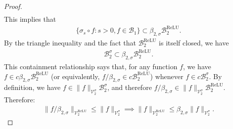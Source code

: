 \documentclass{article}
\DeclareMathOperator{\ReLU}{\mathrm{ReLU}}
\def\cB{{\mathcal{B}}}
\def\cV{{\mathcal{V}}}
\begin{document}
\begin{appendices}
\begin{proof}
\begin{align}
    \end{align}
    This implies that
    \begin{align}
        \{ \sigma_s \circ f: s > 0, f \in \cB_1 \} \subset \beta_{2,\sigma} \cB_2^{\ReLU}.
    \end{align}
    By the triangle inequality and the fact that $\cB_2^{\ReLU}$ is itself closed, we have
    \begin{align}
        \cB_2^\sigma \subset \beta_{2,\sigma} \cB_2^{\ReLU}. 
    \end{align}
    This containment relationship says that, for any function $f$, we have $f \in c \beta_{2,\sigma} \cB_2^{\ReLU}$ (or equivalently, $f/\beta_{2,\sigma} \in c \cB_2^{\ReLU}$) whenever $f \in c  \cB_2^\sigma$. By definition, we have $f \in \| f \|_{\cV_2^\sigma} \cB_2^\sigma$, and therefore $f / \beta_{2,\sigma} \in \| f \|_{\cV_2^\sigma} \cB_2^{\ReLU}$. Therefore:
    \begin{align}
        \| f / \beta_{2,\sigma} \|_{\cV_2^{\ReLU}} \leq \| f \|_{\cV_2^\sigma} \implies \| f \|_{\cV_2^{\ReLU}} \leq \beta_{2,\sigma} \| f \|_{\cV_2^\sigma}.
    \end{align}
    
    

\end{proof}
\end{appendices}
\end{document}
